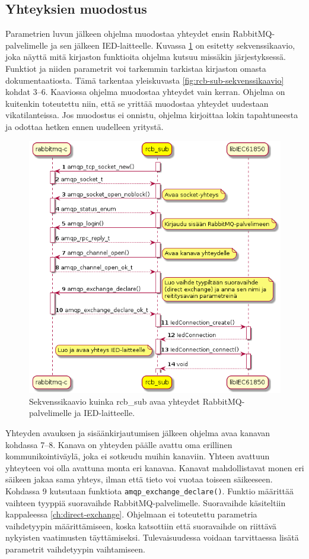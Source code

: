 \subsection{Yhteyksien muodostus}
Parametrien luvun jälkeen ohjelma muodostaa yhteydet ensin RabbitMQ-palvelimelle ja sen jälkeen IED-laitteelle. Kuvassa \ref{fig:rcb-sub-open-connections} on esitetty sekvenssikaavio, joka näyttä mitä kirjaston funktioita ohjelma kutsuu missäkin järjestyksessä. Funktiot ja niiden parametrit voi tarkemmin tarkistaa kirjaston omasta dokumentaatiosta. Tämä tarkentaa yleiskuvasta \ref{fig:rcb-sub-sekvenssikaavio} kohdat 3--6. Kaaviossa ohjelma muodostaa yhteydet vain kerran. Ohjelma on kuitenkin toteutettu niin, että se yrittää muodostaa yhteydet uudestaan vikatilanteissa. Jos muodostus ei onnistu, ohjelma kirjoittaa lokin tapahtuneesta ja odottaa hetken ennen uudelleen yritystä.

\begin{figure}[ht!]
	\includegraphics[width=1\textwidth]{pictures/rcb-sub-open-connections.png}
	\caption{Sekvenssikaavio kuinka rcb\_sub avaa yhteydet RabbitMQ-palvelimelle ja IED-laitteelle.}
	\label{fig:rcb-sub-open-connections}
\end{figure}

Yhteyden avauksen ja sisäänkirjautumisen jälkeen ohjelma avaa kanavan kohdassa 7--8. Kanava on yhteyden päälle avattu oma erillinen kommunikointiväylä, joka ei sotkeudu muihin kanaviin. Yhteen avattuun yhteyteen voi olla avattuna monta eri kanavaa. Kanavat mahdollistavat monen eri säikeen jakaa sama yhteys, ilman että tieto voi vuotaa toiseen säikeeseen. Kohdassa 9 kutsutaan funktiota \texttt{amqp\_exchange\_declare()}. Funktio määrittää vaihteen tyyppiä suoravaihde RabbitMQ-palvelimelle. Suoravaihde käsiteltiin kappaleessa \ref{ch:direct-exchange}. Ohjelmaan ei toteutettu parametria vaihdetyypin määrittämiseen, koska katsottiin että suoravaihde on riittävä nykyisten vaatimusten täyttämiseksi. Tulevaisuudessa voidaan tarvittaessa lisätä parametrit vaihdetyypin vaihtamiseen.


